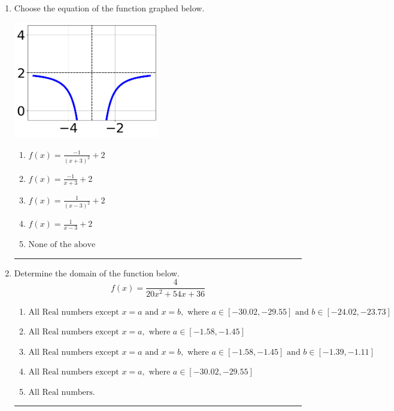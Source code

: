 \documentclass[14pt]{extbook}
\newcommand{\litem}[1]{\item#1\hspace*{-1cm}\rule{\textwidth}{0.4pt}}
\begin{document}
\begin{enumerate}
{\begin{enumerate}[label=\Alph*.]
\end{enumerate} }
\litem{
Choose the equation of the function graphed below.
\begin{center}
    \includegraphics[width=0.5\textwidth]{../Figures/rationalGraphToEquationCopyA.png}
\end{center}
\begin{enumerate}[label=\Alph*.]
\item \( f(x) = \frac{-1}{(x + 3)^2} + 2 \)
\item \( f(x) = \frac{-1}{x + 3} + 2 \)
\item \( f(x) = \frac{1}{(x - 3)^2} + 2 \)
\item \( f(x) = \frac{1}{x - 3} + 2 \)
\item \( \text{None of the above} \)

\end{enumerate} }
\litem{
Determine the domain of the function below.\[ f(x) = \frac{4}{20x^{2} +54 x + 36} \]\begin{enumerate}[label=\Alph*.]
\item \( \text{All Real numbers except } x = a \text{ and } x = b, \text{ where } a \in [-30.02, -29.55] \text{ and } b \in [-24.02, -23.73] \)
\item \( \text{All Real numbers except } x = a, \text{ where } a \in [-1.58, -1.45] \)
\item \( \text{All Real numbers except } x = a \text{ and } x = b, \text{ where } a \in [-1.58, -1.45] \text{ and } b \in [-1.39, -1.11] \)
\item \( \text{All Real numbers except } x = a, \text{ where } a \in [-30.02, -29.55] \)
\item \( \text{All Real numbers.} \)

\end{enumerate} }
\end{enumerate}
\end{document}
